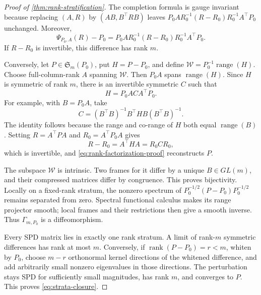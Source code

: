 \documentclass[10pt]{article}
\theoremstyle{plain}
\theoremstyle{definition}
\theoremstyle{remark}
\newcommand{\rank}{\operatorname{rank}}
\newcommand{\range}{\operatorname{range}}
\begin{document}
\begin{proof}[Proof of \cref{thm:rank-stratification}]
The completion formula is gauge invariant because replacing
\((A,R)\) by \((AB,B^\top RB)\) leaves
\(P_0AR_0^{-1}(R-R_0)R_0^{-1}A^\top P_0\) unchanged.  Moreover,
\begin{equation}
  \Psi_{P_0,A}(R)-P_0
  =P_0AR_0^{-1}(R-R_0)R_0^{-1}A^\top P_0.
  \label{eq:rank-factorization-proof}
\end{equation}
If \(R-R_0\) is invertible, this difference has rank \(m\).

Conversely, let \(P\in\mathfrak S_m(P_0)\), put \(H=P-P_0\), and define
\(\mathcal W=P_0^{-1}\range(H)\).  Choose full-column-rank \(A\) spanning
\(\mathcal W\).  Then \(P_0A\) spans \(\range(H)\).  Since \(H\) is
symmetric of rank \(m\), there is an invertible symmetric \(C\) such that
\[
  H=P_0ACA^\top P_0.
\]
For example, with \(B=P_0A\), take
\[
  C=(B^\top B)^{-1}B^\top H B(B^\top B)^{-1}.
\]
The identity follows because the range and co-range of \(H\) both equal
\(\range(B)\).  Setting \(R=A^\top PA\) and \(R_0=A^\top P_0A\) gives
\[
  R-R_0=A^\top H A=R_0CR_0,
\]
which is invertible, and \eqref{eq:rank-factorization-proof} reconstructs
\(P\).

The subspace \(\mathcal W\) is intrinsic.  Two frames for it differ by a
unique \(B\in GL(m)\), and their compressed matrices differ by congruence.
This proves bijectivity.  Locally on a fixed-rank stratum, the nonzero
spectrum of \(P_0^{-1/2}(P-P_0)P_0^{-1/2}\) remains separated from zero.
Spectral functional calculus makes its range projector smooth; local frames
and their restrictions then give a smooth inverse.  Thus \(\Gamma_{m,P_0}\)
is a diffeomorphism.

Every SPD matrix lies in exactly one rank stratum.  A limit of rank-\(m\)
symmetric differences has rank at most \(m\).  Conversely, if
\(\rank(P-P_0)=r<m\), whiten by \(P_0\), choose \(m-r\) orthonormal kernel
directions of the whitened difference, and add arbitrarily small nonzero
eigenvalues in those directions.  The perturbation stays SPD for sufficiently
small magnitudes, has rank \(m\), and converges to \(P\).  This proves
\eqref{eq:strata-closure}.
\end{proof}
\end{document}
